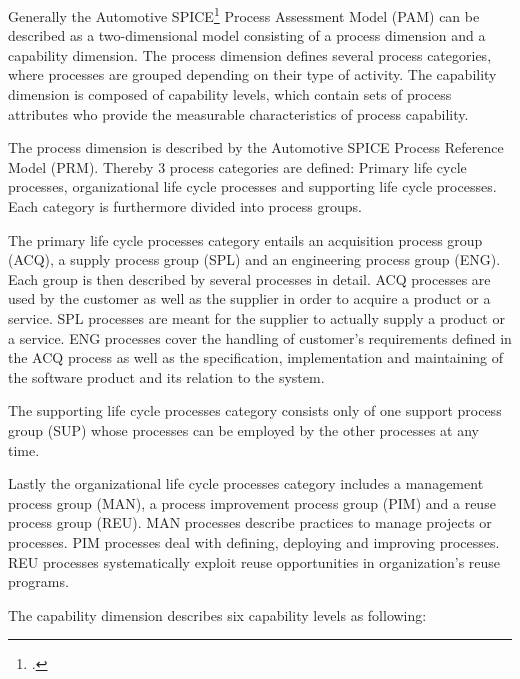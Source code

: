 Generally the Automotive SPICE\footcite{AUTOSPICE} Process Assessment Model (PAM) can be described as a two-dimensional model consisting of a process dimension 
and a capability dimension. The process dimension defines several process categories, where processes are grouped depending on their type of 
activity. The capability dimension is composed of capability levels, which contain sets of process attributes who provide the measurable 
characteristics of process capability.

The process dimension is described by the Automotive SPICE Process Reference Model (PRM). Thereby 3 process categories are defined: Primary life
cycle processes, organizational life cycle processes and supporting life cycle processes. Each category is furthermore divided into process groups.

The primary life cycle processes category entails an acquisition process group (ACQ), a supply process group (SPL) and an engineering process 
group (ENG). Each group is then described by several processes in detail. ACQ processes are used by the customer as well as the supplier in 
order to acquire a product or a service. SPL processes are meant for the supplier to actually supply a product or a service. ENG processes 
cover the handling of customer’s requirements defined in the ACQ process as well as the specification, implementation and maintaining of the 
software product and its relation to the system.

The supporting life cycle processes category consists only of one support process group (SUP) whose processes can be employed by the other processes at any time.

Lastly the organizational life cycle processes category includes a management process group (MAN), a process improvement process group (PIM) 
and a reuse process group (REU). MAN processes describe practices to manage projects or processes. PIM processes deal with defining, deploying 
and improving processes. REU processes systematically exploit reuse opportunities in organization’s reuse programs.

The capability dimension describes six capability levels as following:

